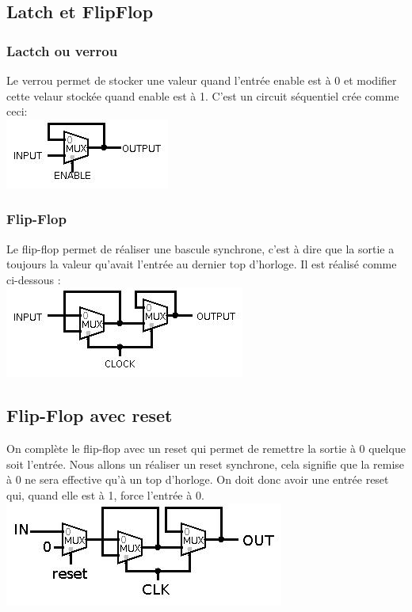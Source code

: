 \documentclass[10pt,a4paper]{article}
\begin{document}
\subsection{Latch et FlipFlop}
\subsubsection{Lactch ou verrou}
Le verrou permet de stocker une valeur quand l'entrée enable est à 0 et modifier cette velaur stockée quand enable est à 1. C'est un circuit séquentiel crée comme ceci:\\
\includegraphics[scale=1]{Verrou.jpg} 

\subsubsection{Flip-Flop}
Le flip-flop permet de réaliser une bascule synchrone, c'est à dire que la sortie a toujours la valeur qu'avait l'entrée au dernier top d'horloge. Il est réalisé comme ci-dessous :\\
\includegraphics[scale=1]{FlipFlop.jpg} 

\subsection{Flip-Flop avec reset}
On complète le flip-flop avec un reset qui permet de remettre la sortie à 0 quelque soit l'entrée. Nous allons un réaliser un reset synchrone, cela signifie que la remise à 0 ne sera effective qu'à un top d'horloge. On doit donc avoir une entrée reset qui, quand elle est à 1, force l'entrée à 0.\\
\includegraphics[scale=1]{FlipFlopReset.jpg} 
\end{document}
